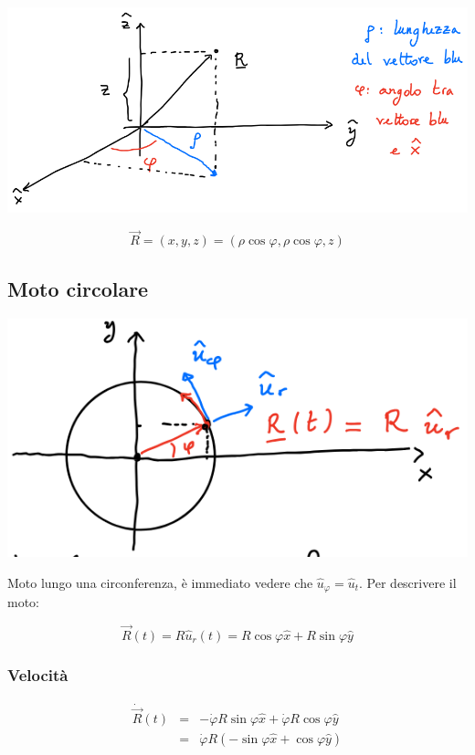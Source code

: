 \documentclass{subfiles}
\begin{document}
\includegraphics[width=\columnwidth]{esempio-coordinate-cilindriche}

$$
\vec{R} = (x,y,z) = (\rho \cos{\varphi}, \rho \cos{\varphi}, z)
$$

\subsection{Moto circolare}

\includegraphics[width=\columnwidth]{esempio-moto-circolare}

\noindent
Moto lungo una circonferenza, è immediato vedere che $\hat{u}_\varphi = \hat{u}_t$.
Per descrivere il moto:

$$
\vec{R}(t) = R \hat{u}_r(t) = R \cos{\varphi} \hat{x} + R \sin{\varphi} \hat{y}
$$

\subsubsection{Velocità}

$$
\begin{matrix}
\dot{\vec{R}}(t) &=& -\dot{\varphi} R \sin{\varphi} \hat{x} + \dot{\varphi} R \cos{\varphi} \hat{y} \\
&=& \dot{\varphi} R (-\sin{\varphi} \hat{x} + \cos{\varphi} \hat{y})
\end{matrix}
$$
\end{document}
